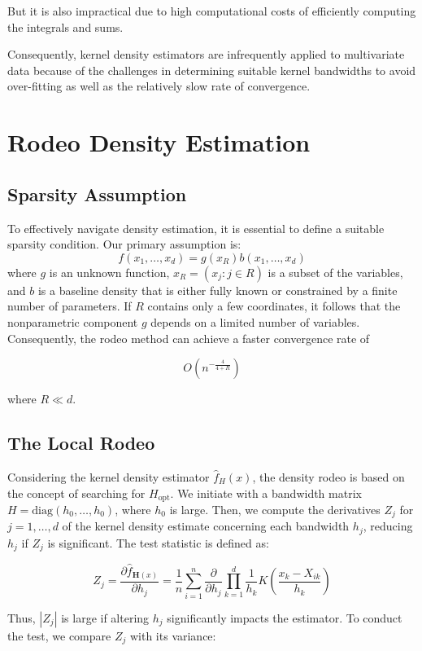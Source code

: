 \documentclass{article}
\begin{document}
But it is also impractical due to high computational costs of efficiently computing the integrals and sums.

Consequently, kernel density estimators are infrequently applied to multivariate data because of the challenges in determining suitable kernel bandwidths to avoid over-fitting as well as the relatively slow rate of convergence.

\section{Rodeo Density Estimation}

\subsection{Sparsity Assumption}

To effectively navigate density estimation, it is essential to define a suitable sparsity condition. Our primary assumption is:
$$
f(x_1, \dots, x_d) = g(x_R) b(x_1, \dots, x_d)
$$
where $g$ is an unknown function, $x_R = (x_j : j \in R)$ is a subset of the variables, and $b$ is a baseline density that is either fully known or constrained by a finite number of parameters. If $R$ contains only a few coordinates, it follows that the nonparametric component $g$ depends on a limited number of variables. Consequently, the rodeo method can achieve a faster convergence rate of 

$$
O\left( n^{-\frac{4}{4+R}} \right)
$$

where $R \ll d$.


\subsection{The Local Rodeo}

Considering the kernel density estimator $\hat{f}_H(x)$, the density rodeo is based on the concept of searching for $H_{\text{opt}}$. We initiate with a bandwidth matrix $H = \text{diag}(h_0, \ldots, h_0)$, where $h_0$ is large. Then, we compute the derivatives $Z_j$ for $j = 1, \ldots, d$ of the kernel density estimate concerning each bandwidth $h_j$, reducing $h_j$ if $Z_j$ is significant. The test statistic is defined as:

$$
Z_j = \frac{\partial \hat{f}_{\mathbf{H}(x)}}{\partial h_j} = \frac{1}{n} \sum_{i=1}^{n} \frac{\partial}{\partial h_j} \prod_{k=1}^{d} \frac{1}{h_k} K\left( \frac{x_k - X_{ik}}{h_k} \right)
$$

Thus, $|Z_j|$ is large if altering $h_j$ significantly impacts the estimator. To conduct the test, we compare $Z_j$ with its variance:
\end{document}
